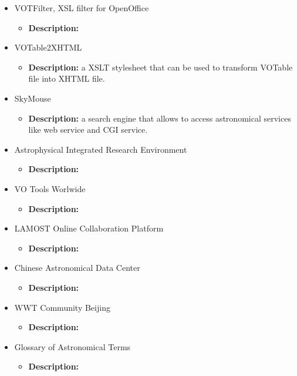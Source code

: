 \begin{itemize}
\begin{itemize}
\item VOTFilter, XSL filter for OpenOffice
\begin{itemize}
\item \textbf{Description:}
\end{itemize}
\item VOTable2XHTML
\begin{itemize}
\item \textbf{Description:} a XSLT stylesheet that can be used to transform
VOTable file into XHTML file.
\end{itemize}
\item SkyMouse
\begin{itemize}
\item \textbf{Description:} a search engine that allows to access astronomical
services like web service and CGI service.
\end{itemize}
\item Astrophysical Integrated Research Environment
\begin{itemize}
\item \textbf{Description:}
\end{itemize}
\item VO Tools Worlwide
\begin{itemize}
\item \textbf{Description:}
\end{itemize}
\item LAMOST Online Collaboration Platform
\begin{itemize}
\item \textbf{Description:}
\end{itemize}
\item Chinese Astronomical Data Center 
\begin{itemize}
\item \textbf{Description:}
\end{itemize}
\item WWT Community Beijing
\begin{itemize}
\item \textbf{Description:}
\end{itemize}
\item Glossary of Astronomical Terms
\begin{itemize}
\item \textbf{Description:}
\end{itemize}
\end{itemize}
\end{itemize}


